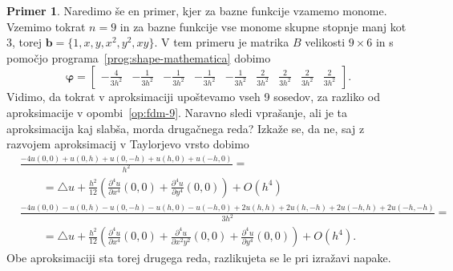 \documentclass[12pt,a4paper,twoside]{article}
\theoremstyle{definition} %
\newtheorem{primer}[definicija]{Primer}
\theoremstyle{plain} %
\numberwithin{equation}{section}
\newcommand{\lap}{\triangle}
\renewcommand{\b}{\boldsymbol}
\renewcommand{\phi}{\varphi}
\newcommand{\dpar}[2]{\ensuremath{\frac{\partial #1}{\partial #2}}}
\begin{document}
\begin{primer}
  Naredimo še en primer, kjer za bazne funkcije vzamemo monome. Vzemimo tokrat
  $n = 9$ in za bazne funkcije vse monome skupne stopnje manj kot 3, torej $\b b = \{1,
  x, y, x^2, y^2, xy\}$. V tem primeru je matrika $B$ velikosti $9\times 6$ in
  s pomočjo programa~\ref{prog:shape-mathematica} dobimo
  \[
    \b\phi =
    \begin{bmatrix}
-\frac{4}{3 h^2} & -\frac{1}{3 h^2} & -\frac{1}{3 h^2} & -\frac{1}{3 h^2} &
-\frac{1}{3 h^2} & \frac{2}{3 h^2} & \frac{2}{3 h^2} & \frac{2}{3 h^2} &
\frac{2}{3 h^2}
    \end{bmatrix}.
  \]
  Vidimo, da tokrat v aproksimaciji upoštevamo vseh 9 sosedov, za razliko od
  aproksimacije v opombi~\ref{op:fdm-9}. Naravno sledi vprašanje, ali je ta
  aproksimacija kaj slabša, morda drugačnega reda? Izkaže se, da ne, saj z
  razvojem aproksimacij v Taylorjevo vrsto dobimo
  \scriptsize
  \begin{align*}
    &\frac{-4 u(0, 0) + u(0, h) + u(0, -h) + u(h, 0) + u(-h, 0)}{h^2} = \\
    & \qquad = \lap u + \frac{h^2}{12}\left(\dpar{^4u}{x^4}(0,0) +
  \dpar{^4u}{y^4}(0, 0)\right) + O(h^4) \\
    &\frac{-4 u(0, 0) - u(0, h) - u(0, -h) - u(h, 0) - u(-h, 0)
    + 2u(h, h) + 2u(h, -h) + 2u(-h, h) + 2u(-h, -h)}{3h^2} = \\
    & \qquad =
    \lap u + \frac{h^2}{12}\left(\dpar{^4u}{x^4}(0,0) + \dpar{^4u}{x^2y^2}(0,0) +
    \dpar{^4u}{y^4}(0, 0)\right) + O(h^4).
  \end{align*}
  \normalsize
  Obe aproksimaciji sta torej drugega reda, razlikujeta se le pri izražavi
  napake.
\end{primer}
\end{document}
